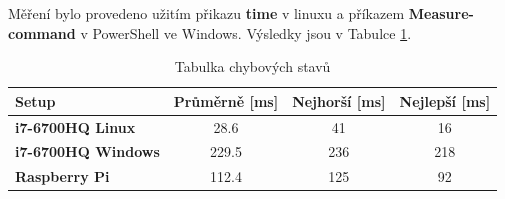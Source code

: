 \documentclass[12pt]{article}
\begin{document}
Měření bylo provedeno užitím přikazu \textbf{time} v linuxu a příkazem 
\textbf{Measure-command} v PowerShell ve Windows. Výsledky jsou v Tabulce
\ref{tab:time_tests}.
\begin{table}[H]
        \begin{tabular}{|l|c|c|c|}
                \hline
		\textbf{Setup} & \textbf{Průměrně [ms]} &
		\textbf{Nejhorší [ms]} & \textbf{Nejlepší [ms]}\\
                \hline
                \bf i7-6700HQ Linux & 28.6 & 41 & 16\\
		\hline
                \bf i7-6700HQ Windows & 229.5  & 236 & 218 \\
		\hline
                \bf Raspberry Pi & 112.4 & 125 & 92\\
		\hline
        \end{tabular}
        \caption{Tabulka chybových stavů}
        \label{tab:time_tests}
\end{table}
\end{document}

